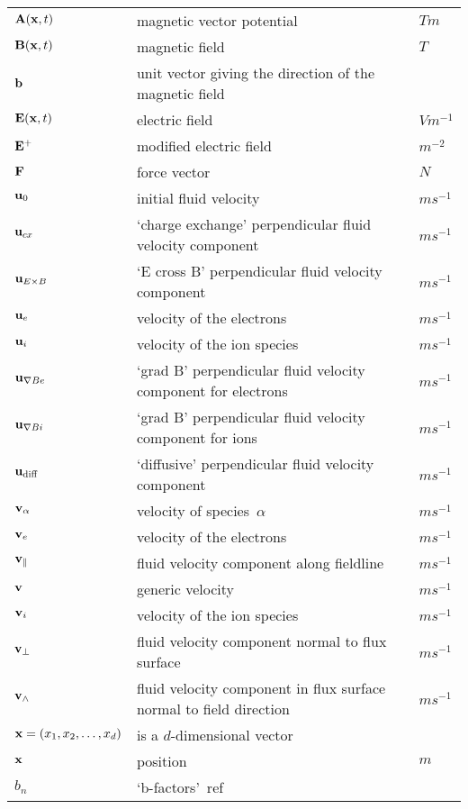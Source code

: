 \begin{longtable}{|p{3.0cm}|p{10.0cm}|p{3.0cm}|}
${\bf A}({\bf x},t)$ & magnetic vector potential   &  $T m$ \\
${\bf B}({\bf x},t)$ & magnetic field  &  $T$ \\
${\bf b}$ & unit vector giving the direction of the magnetic field & \\
${\bf E}({\bf x},t)$ & electric field  &  $V m^{-1}$ \\
${\bf E}^{+}$ & modified electric field  &  $m^{-2}$ \\
${\bf F}$ & force vector  &  $N$ \\
${\bf u}_0$ & initial fluid velocity  &  $m s^{-1}$ \\
${\bf u}_{cx}$ & `charge exchange' perpendicular fluid velocity component  &  $m s^{-1}$ \\
${\bf u}_{E \times B}$ & `E cross B' perpendicular fluid velocity component  &  $m s^{-1}$ \\
${\bf u}_e$ & velocity of the electrons  &  $m s^{-1}$ \\
${\bf u}_i$ & velocity of the ion species  &  $m s^{-1}$ \\
${\bf u}_{\nabla B e}$ & `grad B' perpendicular fluid velocity component for electrons  &  $m s^{-1}$ \\
${\bf u}_{\nabla B i}$ & `grad B' perpendicular fluid velocity component for ions  &  $m s^{-1}$ \\
${\bf u}_\textrm{diff}$ & `diffusive' perpendicular fluid velocity component  &  $m s^{-1}$ \\
${\bf v}_\alpha$ & velocity of species~$\alpha$  &  $m s^{-1}$ \\
${\bf v}_e$ & velocity of the electrons  &  $m s^{-1}$ \\
${\bf v}_{\|}$ & fluid velocity component along fieldline  &  $m s^{-1}$ \\
${\bf v}$ & generic velocity  &  $m s^{-1}$ \\
${\bf v}_i$ & velocity of the ion species  &  $m s^{-1}$ \\
${\bf v}_\perp$ & fluid velocity component normal to flux surface  &  $m s^{-1}$ \\
${\bf v}_\wedge$ & fluid velocity component in flux surface normal to field direction  &  $m s^{-1}$ \\
${\bf x}=\left(x_1,x_2,\dots,x_d\right)$ & is a $d$-dimensional vector  & \\
${\bf x}$ & position  &  $m$ \\
$b_n$ & `b-factors'~ref~\cite[slide 21]{omullane} & \\

\end{longtable}

